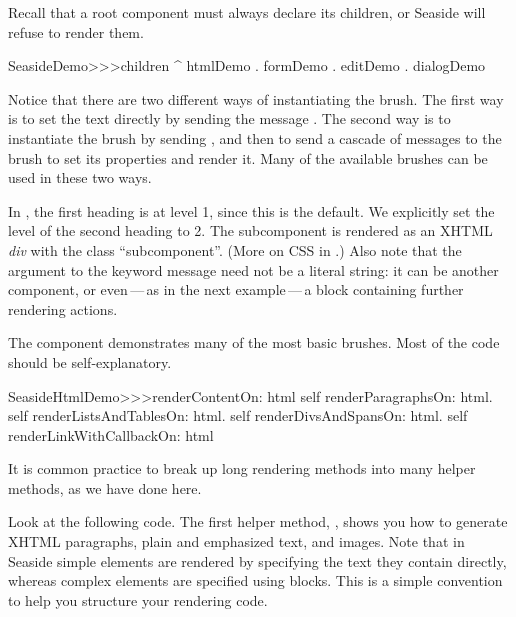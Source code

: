 \documentclass[a4paper,10pt,twoside]{book}
\begin{document}
{{\noindent
Recall that a root component must always declare its children, or Seaside will refuse to render them.
\begin{code}{}
SeasideDemo>>>children
	^ { htmlDemo . formDemo . editDemo . dialogDemo }
\end{code}

Notice that there are two different ways of instantiating the  brush.
The first way is to set the text directly by sending the message .
The second way is to instantiate the brush by sending , and then to send a cascade of messages to the brush to set its properties and render it.
Many of the available brushes can be used in these two ways.



In , the first heading is at level 1, since this is the default.
We explicitly set the level of the second heading to 2.
The subcomponent is rendered as an XHTML \emph{div} with the  class ``subcomponent''.
(More on CSS in .)
Also note that the argument to the  keyword message need not be a literal string: it can be another component, or even\,---\,as in the next example\,---\,a block containing further rendering actions.

The  component demonstrates many of the most basic brushes.
Most of the code should be self-explanatory.

\begin{code}{}
SeasideHtmlDemo>>>renderContentOn: html 
	self renderParagraphsOn: html.
	self renderListsAndTablesOn: html.
	self renderDivsAndSpansOn: html.
	self renderLinkWithCallbackOn: html
\end{code}

It is common practice to break up long rendering methods into many helper methods, as we have done here.


Look at the following code.  
The first helper method, , shows you how to generate XHTML paragraphs, plain and emphasized text, and images.
Note that in Seaside simple elements are rendered by specifying the text they contain directly, whereas complex elements are specified using blocks.
This is a simple convention to help you structure your rendering code.

}}
\end{document}
